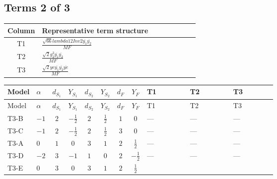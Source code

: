 \documentclass[8pt]{article}
\begin{document}
\begin{landscape}
\subsection*{Terms 2 of 3}
\begin{center}
\begin{tabular}{@{}c >{\raggedright\arraybackslash}p{0.82\linewidth}@{}}
\toprule
Column & Representative term structure \\
\midrule
T1 & \(\displaystyle \frac{\sqrt{66} lambda12Inv2 \overline{y_{1}} \overline{y_{2}}}{MF}\) \\
\midrule
T2 & \(\displaystyle \frac{\sqrt{2} g_{2}^{2} \overline{y_{1}} \overline{y_{2}}}{MF}\) \\
\midrule
T3 & \(\displaystyle \frac{\sqrt{2} ye \overline{y_{1}} \overline{y_{2}} \overline{ye}}{MF}\) \\
\midrule
\bottomrule
\end{tabular}
\end{center}
\smallskip
\tiny
\begin{longtable}{@{}llcccccc >{\raggedright\arraybackslash}p{0.21\linewidth} >{\raggedright\arraybackslash}p{0.21\linewidth} >{\raggedright\arraybackslash}p{0.21\linewidth}@{}}
\toprule
Model & $\alpha$ & $d_{S_1}$ & $Y_{S_1}$ & $d_{S_2}$ & $Y_{S_2}$ & $d_F$ & $Y_F$ & T1 & T2 & T3 \\
\midrule
\endfirsthead
\toprule
Model & $\alpha$ & $d_{S_1}$ & $Y_{S_1}$ & $d_{S_2}$ & $Y_{S_2}$ & $d_F$ & $Y_F$ & T1 & T2 & T3 \\
\midrule
\endhead
T3-B & $-1$ & $2$ & $-\frac{1}{2}$ & $2$ & $\frac{1}{2}$ & $1$ & $0$ & --- & --- & --- \\
\midrule
T3-C & $-1$ & $2$ & $-\frac{1}{2}$ & $2$ & $\frac{1}{2}$ & $3$ & $0$ & --- & --- & --- \\
\midrule
T3-A & $0$ & $1$ & $0$ & $3$ & $1$ & $2$ & $\frac{1}{2}$ & --- & --- & --- \\
\midrule
T3-D & $-2$ & $3$ & $-1$ & $1$ & $0$ & $2$ & $-\frac{1}{2}$ & --- & --- & --- \\
\midrule
T3-E & $0$ & $3$ & $0$ & $3$ & $1$ & $2$ & $\frac{1}{2}$ & \scriptsize\adjustbox{max width=\linewidth}{$\begin{gathered} \frac{3 \sqrt{66} lambda12Inv2 \overline{y_{1}} \overline{y_{2}}}{44 MF}\end{gathered}$} & \scriptsize\adjustbox{max width=\linewidth}{$\begin{gathered} \frac{49 \sqrt{2} g_{2}^{2} \overline{y_{1}} \overline{y_{2}}}{16 MF}\end{gathered}$} & \scriptsize\adjustbox{max width=\linewidth}{$\begin{gathered} - \frac{\sqrt{2} ye \overline{y_{1}} \overline{y_{2}} \overline{ye}}{8 MF}\end{gathered}$} \\
\midrule
\bottomrule
\end{longtable}
\clearpage

\end{landscape}
\end{document}
